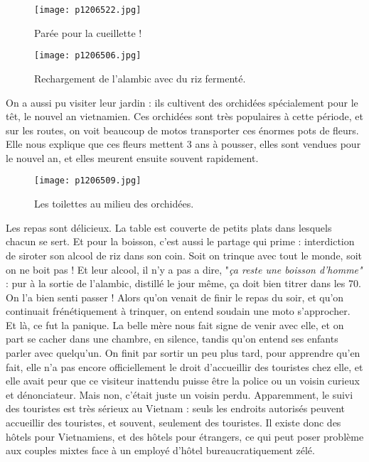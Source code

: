 \documentclass{book}
\begin{document}
\begin{figure}[h]
\centering
\texttt{[image: p1206522.jpg]}
\caption*{Parée pour la cueillette !}
\end{figure}


\begin{figure}[h]
\centering
\texttt{[image: p1206506.jpg]}
\caption*{Rechargement de l'alambic avec du riz fermenté.}
\end{figure}

On a aussi pu visiter leur jardin : ils cultivent des orchidées spécialement pour le têt, le nouvel an vietnamien. Ces orchidées sont très populaires à cette période, et sur les routes, on voit beaucoup de motos transporter ces énormes pots de fleurs. Elle nous explique que ces fleurs mettent 3 ans à pousser, elles sont vendues pour le nouvel an, et elles meurent ensuite souvent rapidement.


\begin{figure}[h]
\centering
\texttt{[image: p1206509.jpg]}
\caption*{Les toilettes au milieu des orchidées.}
\end{figure}

Les repas sont délicieux. La table est couverte de petits plats dans lesquels chacun se sert. Et pour la boisson, c'est aussi le partage qui prime : interdiction de siroter son alcool de riz dans son coin. Soit on trinque avec tout le monde, soit on ne boit pas ! Et leur alcool, il n'y a pas a dire, "\emph{ça reste une boisson d'homme"} : pur à la sortie de l'alambic, distillé le jour même, ça doit bien titrer dans les 70\textdegree . On l'a bien senti passer ! Alors qu'on venait de finir le repas du soir, et qu'on continuait frénétiquement à trinquer, on entend soudain une moto s'approcher. Et là, ce fut la panique. La belle mère nous fait signe de venir avec elle, et on part se cacher dans une chambre, en silence, tandis qu'on entend ses enfants parler avec quelqu'un. On finit par sortir un peu plus tard, pour apprendre qu'en fait, elle n'a pas encore officiellement le droit d'accueillir des touristes chez elle, et elle avait peur que ce visiteur inattendu puisse être la police ou un voisin curieux et dénonciateur. Mais non, c'était juste un voisin perdu. Apparemment, le suivi des touristes est très sérieux au Vietnam : seuls les endroits autorisés peuvent accueillir des touristes, et souvent, seulement des touristes. Il existe donc des hôtels pour Vietnamiens, et des hôtels pour étrangers, ce qui peut poser problème aux couples mixtes face à un employé d'hôtel bureaucratiquement zélé.
\end{document}
